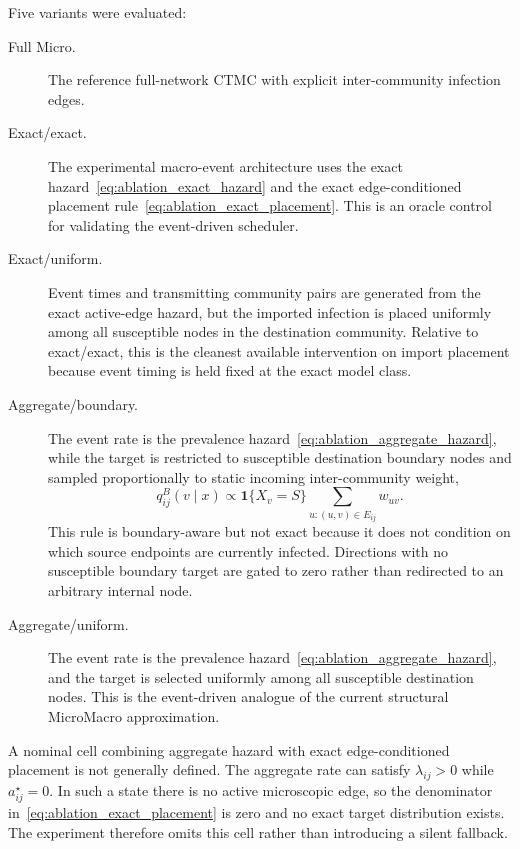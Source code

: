 Five variants were evaluated:
\begin{description}
    \item[Full Micro.] The reference full-network CTMC with explicit inter-community infection edges.

    \item[Exact/exact.] The experimental macro-event architecture uses the exact hazard~\eqref{eq:ablation_exact_hazard} and the exact edge-conditioned placement rule~\eqref{eq:ablation_exact_placement}.  This is an oracle control for validating the event-driven scheduler.

    \item[Exact/uniform.] Event times and transmitting community pairs are generated from the exact active-edge hazard, but the imported infection is placed uniformly among all susceptible nodes in the destination community.  Relative to exact/exact, this is the cleanest available intervention on import placement because event timing is held fixed at the exact model class.

    \item[Aggregate/boundary.] The event rate is the prevalence hazard~\eqref{eq:ablation_aggregate_hazard}, while the target is restricted to susceptible destination boundary nodes and sampled proportionally to static incoming inter-community weight,
    \begin{equation}
        q^{B}_{ij}(v\mid x)
        \propto
        \mathbf{1}\{X_v=S\}
        \sum_{u:(u,v)\in E_{ij}}w_{uv}.
        \label{eq:ablation_boundary_placement}
    \end{equation}
    This rule is boundary-aware but not exact because it does not condition on which source endpoints are currently infected.  Directions with no susceptible boundary target are gated to zero rather than redirected to an arbitrary internal node.

    \item[Aggregate/uniform.] The event rate is the prevalence hazard~\eqref{eq:ablation_aggregate_hazard}, and the target is selected uniformly among all susceptible destination nodes.  This is the event-driven analogue of the current structural MicroMacro approximation.
\end{description}

A nominal cell combining aggregate hazard with exact edge-conditioned placement is not generally defined.  The aggregate rate can satisfy $\lambda_{ij}>0$ while $a^{\star}_{ij}=0$.  In such a state there is no active microscopic edge, so the denominator in~\eqref{eq:ablation_exact_placement} is zero and no exact target distribution exists.  The experiment therefore omits this cell rather than introducing a silent fallback.

